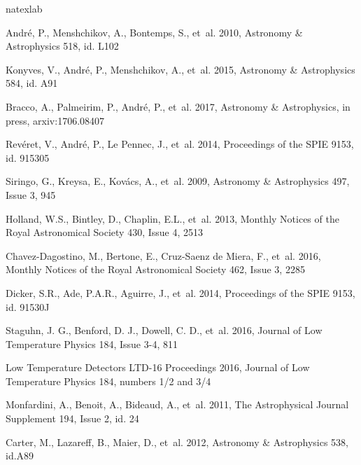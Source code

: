 \begin{thebibliography}{99}

\expandafter\ifx\csname natexlab\endcsname\relax\def\natexlab#1{#1}\fi

Andr\'e, P., Menshchikov, A., Bontemps, S., {et~al.} 2010, 
Astronomy \& Astrophysics 518, id. L102

Konyves, V., Andr\'e, P., Menshchikov, A., {et~al.} 2015, 
Astronomy \& Astrophysics 584, id. A91

Bracco, A., Palmeirim, P., Andr\'e, P., {et~al.} 2017, 
Astronomy \& Astrophysics, in press, arxiv:1706.08407

Rev\'eret, V., Andr\'e, P., Le Pennec, J., {et~al.} 2014, 
Proceedings of the SPIE 9153, id. 915305

Siringo, G., Kreysa, E., Kov\'acs, A., {et~al.} 2009, 
Astronomy \& Astrophysics 497, Issue 3, 945

Holland, W.S., Bintley, D., Chaplin, E.L., {et~al.} 2013, 
Monthly Notices of the Royal Astronomical Society 430, Issue 4, 2513

Chavez-Dagostino, M., Bertone, E., Cruz-Saenz de Miera, F., {et~al.} 2016, 
Monthly Notices of the Royal Astronomical Society 462, Issue 3, 2285

Dicker, S.R., Ade, P.A.R., Aguirre, J., {et~al.} 2014,
Proceedings of the SPIE 9153, id. 91530J 

Staguhn, J. G., Benford, D. J., Dowell, C. D., {et~al.} 2016,
Journal of Low Temperature Physics 184, Issue 3-4, 811

Low Temperature Detectors LTD-16 Proceedings 2016,  Journal of Low
  Temperature Physics 184, numbers 1/2 and 3/4

Monfardini, A., Benoit, A., Bideaud, A., {et~al.} 2011, 
The Astrophysical Journal Supplement 194, Issue 2, id. 24

Carter, M., Lazareff, B., Maier, D., {et~al.} 2012, 
Astronomy \& Astrophysics 538, id.A89


\end{thebibliography}
